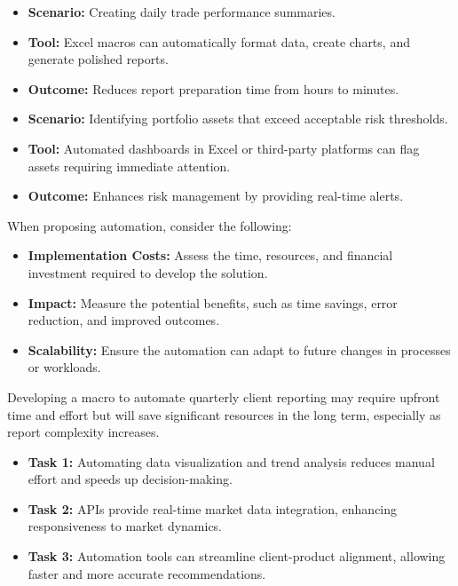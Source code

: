 \documentclass[11pt]{article}
\begin{document}
\begin{itemize}[leftmargin=1.5em, itemsep=2pt]
  \item \textbf{Scenario:} Creating daily trade performance summaries.
  \item \textbf{Tool:} Excel macros can automatically format data, create
  charts, and generate polished reports.
  \item \textbf{Outcome:} Reduces report preparation time from hours to
  minutes.
\end{itemize}

\begin{itemize}[leftmargin=1.5em, itemsep=2pt]
  \item \textbf{Scenario:} Identifying portfolio assets that exceed acceptable
  risk thresholds.
  \item \textbf{Tool:} Automated dashboards in Excel or third-party platforms
  can flag assets requiring immediate attention.
  \item \textbf{Outcome:} Enhances risk management by providing real-time
  alerts.
\end{itemize}

When proposing automation, consider the following:
\begin{itemize}[leftmargin=1.5em, itemsep=2pt]
  \item \textbf{Implementation Costs:} Assess the time, resources, and
  financial investment required to develop the solution.
  \item \textbf{Impact:} Measure the potential benefits, such as time savings,
  error reduction, and improved outcomes.
  \item \textbf{Scalability:} Ensure the automation can adapt to future changes
  in processes or workloads.
\end{itemize}

Developing a macro to automate quarterly client reporting may require upfront
time and effort but will save significant resources in the long term,
especially as report complexity increases.

\begin{itemize}[leftmargin=1.5em, itemsep=2pt]
  \item \textbf{Task 1:} Automating data visualization and trend analysis
  reduces manual effort and speeds up decision-making.
  \item \textbf{Task 2:} APIs provide real-time market data integration,
  enhancing responsiveness to market dynamics.
  \item \textbf{Task 3:} Automation tools can streamline client-product
  alignment, allowing faster and more accurate recommendations.
\end{itemize}
\end{document}
